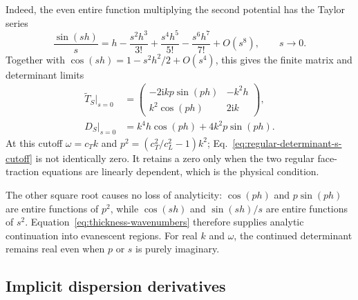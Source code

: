 Indeed, the even entire function multiplying the second potential has the
Taylor series
\begin{equation}
  \frac{\sin(sh)}{s}
  =h-\frac{s^2h^3}{3!}+\frac{s^4h^5}{5!}
    -\frac{s^6h^7}{7!}+O(s^8),
  \qquad s\longrightarrow0.
  \label{eq:sine-ratio-series}
\end{equation}
Together with \(\cos(sh)=1-s^2h^2/2+O(s^4)\), this gives the finite matrix and
determinant limits
\begin{align}
  \widetilde T_S\big|_{s=0}
  &=\begin{pmatrix}
    -2\mathrm{i}kp\sin(ph)&-k^2h\\
    k^2\cos(ph)&2\mathrm{i}k
  \end{pmatrix},                                                    \label{eq:regular-matrix-s-cutoff}\\
  D_S\big|_{s=0}
  &=k^4h\cos(ph)+4k^2p\sin(ph).                                    \label{eq:regular-determinant-s-cutoff}
\end{align}
At this cutoff \(\omega=c_Tk\) and
\(
  p^2=(c_T^2/c_L^2-1)k^2
\); Eq.~\eqref{eq:regular-determinant-s-cutoff} is not identically zero.
It retains a zero only when the two regular face-traction equations are
linearly dependent, which is the physical condition.

The other square root causes no loss of analyticity: \(\cos(ph)\) and
\(p\sin(ph)\) are entire functions of \(p^2\), while
\(\cos(sh)\) and \(\sin(sh)/s\) are entire functions of \(s^2\).
Equation~\eqref{eq:thickness-wavenumbers} therefore supplies analytic
continuation into evanescent regions.  For real \(k\) and \(\omega\), the
continued determinant remains real even when \(p\) or \(s\) is purely
imaginary.

\subsection{Implicit dispersion derivatives}

